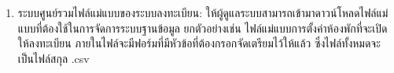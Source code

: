 \begin{enumerate}
  \clearpage
  \item ระบบศูนย์รวมไฟล์แม่แบบของระบบลงทะเบียน: ให้ผู้ดูแลระบบสามารถเข้ามาดาวน์โหลดไฟล์แม่แบบที่ต้องใช้ในการจัดการระบบฐานข้อมูล
        ยกตัวอย่างเช่น ไฟล์แม่แบบการตั้งค่าห้องพักที่จะเปิดให้ลงทะเบียน ภายในไฟล์จะมีฟอร์มที่มีหัวข้อที่ต้องกรอกจัดเตรียมไว้ให้แล้ว ซึ่งไฟล์ทั้งหมดจะเป็นไฟล์สกุล .csv
\end{enumerate}
